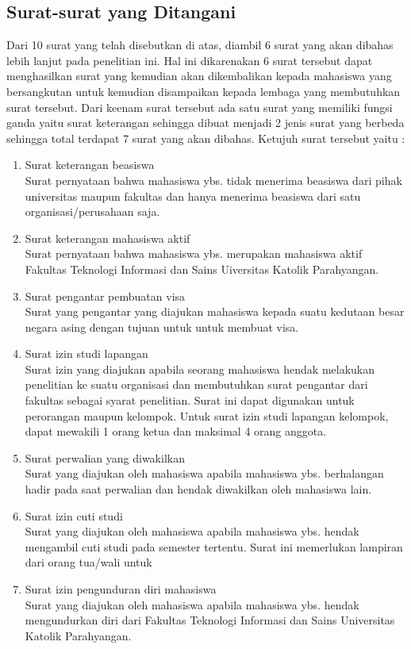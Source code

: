 \subsection{Surat-surat yang Ditangani}
\label{sec:surat_yang_ditangani}
Dari 10 surat yang telah disebutkan di atas, diambil 6 surat yang akan dibahas lebih lanjut pada penelitian ini. Hal ini dikarenakan 6 surat tersebut dapat menghasilkan surat yang kemudian akan dikembalikan kepada mahasiswa yang bersangkutan untuk kemudian disampaikan kepada lembaga yang membutuhkan surat tersebut. Dari keenam surat tersebut ada satu surat yang memiliki fungsi ganda yaitu surat keterangan sehingga dibuat menjadi 2 jenis surat yang berbeda sehingga total terdapat 7 surat yang akan dibahas. Ketujuh surat tersebut yaitu :
\begin{enumerate}
	\item Surat keterangan beasiswa \\
	Surat pernyataan bahwa mahasiswa ybs. tidak menerima beasiswa dari pihak universitas maupun fakultas dan hanya menerima beasiswa dari satu organisasi/perusahaan saja.
	\item Surat keterangan mahasiswa aktif \\
	Surat pernyataan bahwa mahasiswa ybs. merupakan mahasiswa aktif Fakultas Teknologi Informasi dan Sains Uiversitas Katolik Parahyangan.
	\item Surat pengantar pembuatan visa \\
	Surat yang pengantar yang diajukan mahasiswa kepada suatu kedutaan besar negara asing dengan tujuan untuk untuk membuat visa.
	\item Surat izin studi lapangan \\
	Surat izin yang diajukan apabila seorang mahasiswa hendak melakukan penelitian ke suatu organisasi dan membutuhkan surat pengantar dari fakultas sebagai syarat penelitian. Surat ini dapat digunakan untuk perorangan maupun kelompok. Untuk surat izin studi lapangan kelompok, dapat mewakili 1 orang ketua dan maksimal 4 orang anggota.
	\item Surat perwalian yang diwakilkan \\
	Surat yang diajukan oleh mahasiswa apabila mahasiswa ybs. berhalangan hadir pada saat perwalian dan hendak diwakilkan oleh mahasiswa lain. 
	\item Surat izin cuti studi \\
	Surat yang diajukan oleh mahasiswa apabila mahasiswa ybs. hendak mengambil cuti studi pada semester tertentu. Surat ini memerlukan lampiran dari orang tua/wali untuk
	\item Surat izin pengunduran diri mahasiswa \\
	Surat yang diajukan oleh mahasiswa apabila mahasiswa ybs. hendak mengundurkan diri dari Fakultas Teknologi Informasi dan Sains Universitas Katolik Parahyangan.
\end{enumerate}

